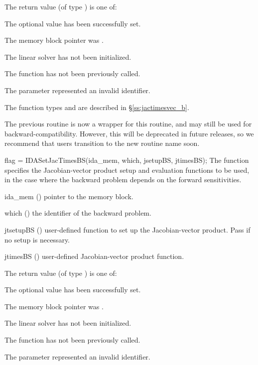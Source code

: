 {
  The return value  (of type ) is one of:
  \begin{args}
  \item[\Id{IDALS\_SUCCESS}]
    The optional value has been successfully set.
  \item[\Id{IDALS\_MEM\_NULL}]
    The  memory block pointer was .
  \item[\Id{IDALS\_LMEM\_NULL}]
    The {\idals} linear solver has not been initialized.
  \item[\Id{IDALS\_NO\_ADJ}]
    The function  has not been previously called.
  \item[\Id{IDALS\_ILL\_INPUT}]
    The parameter  represented an invalid identifier.
  \end{args}
}
{
  The function types  and
   are described in \S\ref{ss:jactimesvec_b}.

  The previous routine  is now a wrapper for this
  routine, and may still be used for backward-compatibility.  However,
  this will be deprecated in future releases, so we recommend that
  users transition to the new routine name soon.
}
{
  flag = IDASetJacTimesBS(ida\_mem, which, jsetupBS, jtimesBS);
}
{
  The function  specifies the Jacobian-vector
  product setup and evaluation functions to be used, in the case where the
  backward problem depends on the forward sensitivities.
}
{
  \begin{args}
  \item[ida\_mem] ()
    pointer to the {\idas} memory block.
  \item[which] ()
    the identifier of the backward problem.
  \item[jtsetupBS] ()
    user-defined function to set up the Jacobian-vector product.
    Pass  if no setup is necessary.
  \item[jtimesBS] ()
    user-defined Jacobian-vector product function.
  \end{args}
}
{
  The return value  (of type ) is one of:
  \begin{args}
  \item[\Id{IDALS\_SUCCESS}]
    The optional value has been successfully set.
  \item[\Id{IDALS\_MEM\_NULL}]
    The  memory block pointer was .
  \item[\Id{IDALS\_LMEM\_NULL}]
    The {\idals} linear solver has not been initialized.
  \item[\Id{IDALS\_NO\_ADJ}]
    The function  has not been previously called.
  \item[\Id{IDALS\_ILL\_INPUT}]
    The parameter  represented an invalid identifier.
  \end{args}
}
